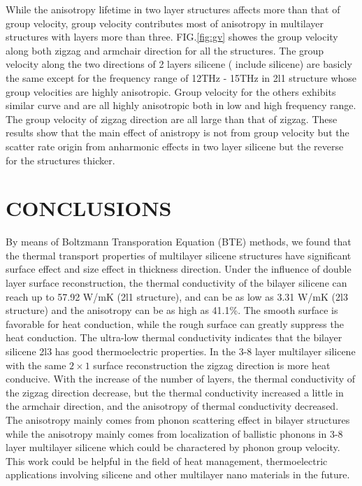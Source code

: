 \documentclass[%
 reprint,
 amsmath,amssymb,
 aps,
 prb,
]{revtex4-1}
\begin{document}
While the anisotropy lifetime in two layer structures affects more than that of group velocity, group velocity contributes most of anisotropy in multilayer structures with layers more than three.  FIG.\ref{fig:gv} showes the group velocity along both zigzag and armchair direction for all the structures. The group velocity  along the two directions of  2 layers silicene ( include silicene) are basicly the same except for the frequency range of 12THz - 15THz in 2l1 structure whose  group velocities are highly anisotropic. Group velocity for the others exhibits similar curve and are all highly anisotropic both in low and high frequency range. The group velocity of zigzag direction are all large than that of zigzag. These results  show that the main effect of anistropy is not from group velocity but the scatter rate origin from anharmonic effects in two layer silicene but the reverse for the structures thicker.



\section{CONCLUSIONS}

By means of Boltzmann Transporation Equation (BTE) methods, we found that the thermal transport properties of multilayer silicene structures have significant surface effect and size effect in thickness direction. Under the influence of double layer surface reconstruction, the thermal conductivity of the bilayer silicene can reach up to 57.92 W/mK (2l1 structure), and can be as low as 3.31 W/mK (2l3 structure) and the anisotropy can be as high as 41.1\%. The smooth surface is favorable for heat conduction, while the rough surface can greatly suppress the heat conduction. The ultra-low thermal conductivity indicates that the bilayer silicene 2l3 has good thermoelectric properties. In the 3-8 layer multilayer silicene with the same $2 \times 1$ surface reconstruction the zigzag direction is more heat conducive. With the increase of the number of layers, the thermal conductivity of the zigzag direction decrease, but the thermal conductivity increased a little in the armchair direction, and the anisotropy of thermal conductivity decreased. The anisotropy mainly comes from phonon scattering effect in bilayer structures while the anisotropy mainly comes from localization of ballistic phonons in 3-8 layer multilayer silicene which could be charactered by phonon group velocity. This work could be helpful in the field of heat management, thermoelectric applications involving silicene and other multilayer nano materials in the future.
\end{document}
